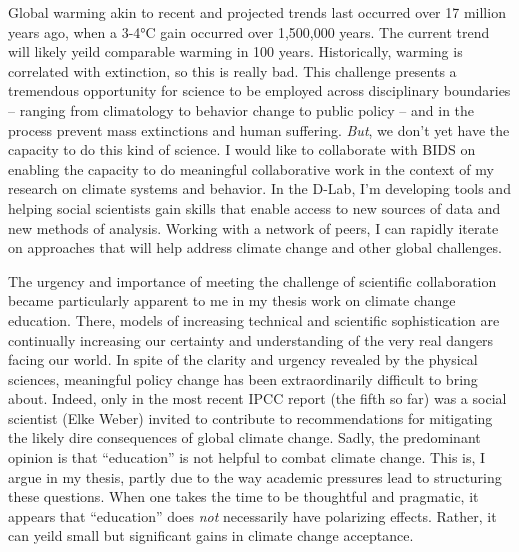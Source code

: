 Global warming akin to recent and projected trends last occurred over 17 million
years ago, when a 3-4°C gain occurred over 1,500,000 years. The current trend
will likely yeild comparable warming in 100 years. Historically, warming is
correlated with extinction, so this is really bad. This challenge presents a
tremendous opportunity for science to be employed across disciplinary boundaries
-- ranging from climatology to behavior change to public policy -- and in the
process prevent mass extinctions and human suffering. \emph{But}, we don't yet
have the capacity to do this kind of science. I would like to collaborate with
BIDS on enabling the capacity to do meaningful collaborative work in the context
of my research on climate systems and behavior. In the D-Lab, I'm developing
tools and helping social scientists gain skills that enable access to new
sources of data and new methods of analysis.  Working with a network of peers, I
can rapidly iterate on approaches that will help address climate change and
other global challenges.

The urgency and importance of meeting the challenge of scientific collaboration
became particularly apparent to me in my thesis work on climate change education.
There, models of increasing technical and scientific sophistication are
continually increasing our certainty and understanding of the very real dangers
facing our world. In spite of the clarity and urgency revealed by the physical
sciences, meaningful policy change has been extraordinarily difficult to bring
about. Indeed, only in the most recent IPCC report (the fifth so far) was a
social scientist (Elke Weber) invited to contribute to recommendations for
mitigating the likely dire consequences of global climate change. Sadly, the
predominant opinion is that “education” is not helpful to combat climate change.
This is, I argue in my thesis, partly due to the way academic pressures lead to
structuring these questions. When one takes the time to be thoughtful and
pragmatic, it appears that “education” does \emph{not} necessarily have
polarizing effects. Rather, it can yeild small but significant gains in climate
change acceptance.


